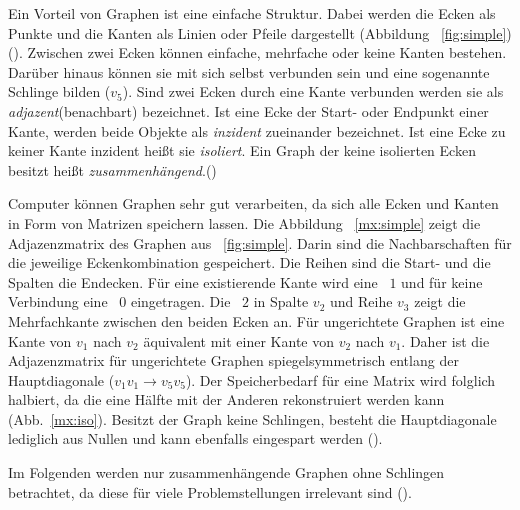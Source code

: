 Ein Vorteil von Graphen ist eine einfache Struktur.
Dabei werden die Ecken als Punkte und die Kanten als Linien oder Pfeile dargestellt (Abbildung ~\ref{fig:simple}) (\cite[49]{kurt}).
Zwischen zwei Ecken können einfache, mehrfache oder keine Kanten bestehen.
Darüber hinaus können sie mit sich selbst verbunden sein und eine sogenannte Schlinge bilden ($v_{5}$).
Sind zwei Ecken durch eine Kante verbunden werden sie als \textit{adjazent}(benachbart) bezeichnet.
Ist eine Ecke der Start- oder Endpunkt einer Kante, werden beide Objekte als \textit{inzident} zueinander bezeichnet.
Ist eine Ecke zu keiner Kante inzident heißt sie \textit{isoliert}.
Ein Graph der keine isolierten Ecken besitzt heißt \textit{zusammenhängend}.(\cite[4\psq]{theory}) \par

Computer können Graphen sehr gut verarbeiten, da sich alle Ecken und Kanten in Form von Matrizen speichern lassen.
Die Abbildung ~\ref{mx:simple} zeigt die Adjazenzmatrix des Graphen aus ~\ref{fig:simple}.
Darin sind die Nachbarschaften für die jeweilige Eckenkombination gespeichert.
Die Reihen sind die Start- und die Spalten die Endecken.
Für eine existierende Kante wird eine ~$1$ und für keine Verbindung eine ~$0$ eingetragen.
Die ~$2$ in Spalte $v_{2}$ und Reihe $v_{3}$ zeigt die Mehrfachkante zwischen den beiden Ecken an.
Für ungerichtete Graphen ist eine Kante von $v_{1}$ nach $v_{2}$ äquivalent mit einer Kante von $v_{2}$ nach $v_{1}$.
Daher ist die Adjazenzmatrix für ungerichtete Graphen spiegelsymmetrisch entlang der Hauptdiagonale ($v_{1}v_{1} \rightarrow v_{5}v_{5}$).
Der Speicherbedarf für eine Matrix wird folglich halbiert, da die eine Hälfte mit der Anderen rekonstruiert werden kann (Abb.~\ref{mx:iso}).
Besitzt der Graph keine Schlingen, besteht die Hauptdiagonale lediglich aus Nullen und kann ebenfalls eingespart werden (\cite[19]{algorithms}).

Im Folgenden werden nur zusammenhängende Graphen ohne Schlingen betrachtet, da diese für viele Problemstellungen irrelevant sind (\cite[4\psq]{theory}).

